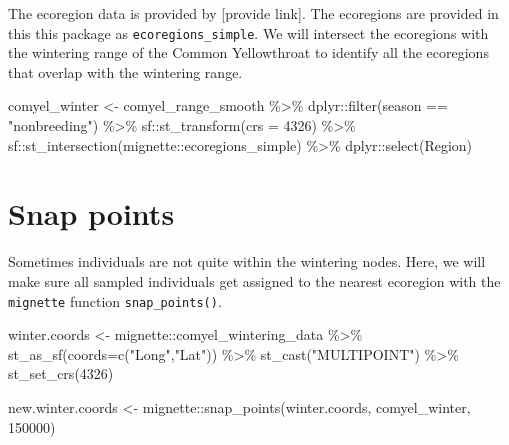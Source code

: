 \documentclass[
]{book}
\newenvironment{Shaded}{\begin{snugshade}}{\end{snugshade}}
\newcommand{\AttributeTok}[1]{\textcolor[rgb]{0.77,0.63,0.00}{#1}}
\newcommand{\DecValTok}[1]{\textcolor[rgb]{0.00,0.00,0.81}{#1}}
\newcommand{\FunctionTok}[1]{\textcolor[rgb]{0.00,0.00,0.00}{#1}}
\newcommand{\NormalTok}[1]{#1}
\newcommand{\OtherTok}[1]{\textcolor[rgb]{0.56,0.35,0.01}{#1}}
\newcommand{\SpecialCharTok}[1]{\textcolor[rgb]{0.00,0.00,0.00}{#1}}
\newcommand{\StringTok}[1]{\textcolor[rgb]{0.31,0.60,0.02}{#1}}
\begin{document}
The ecoregion data is provided by {[}provide link{]}. The ecoregions are provided in this this package as \texttt{ecoregions\_simple}. We will intersect the ecoregions with the wintering range of the Common Yellowthroat to identify all the ecoregions that overlap with the wintering range.

\begin{Shaded}
\begin{Highlighting}[]
\NormalTok{comyel\_winter }\OtherTok{\textless{}{-}}\NormalTok{ comyel\_range\_smooth }\SpecialCharTok{\%\textgreater{}\%}
\NormalTok{  dplyr}\SpecialCharTok{::}\FunctionTok{filter}\NormalTok{(season }\SpecialCharTok{==} \StringTok{"nonbreeding"}\NormalTok{) }\SpecialCharTok{\%\textgreater{}\%}
\NormalTok{  sf}\SpecialCharTok{::}\FunctionTok{st\_transform}\NormalTok{(}\AttributeTok{crs =} \DecValTok{4326}\NormalTok{) }\SpecialCharTok{\%\textgreater{}\%}
\NormalTok{  sf}\SpecialCharTok{::}\FunctionTok{st\_intersection}\NormalTok{(mignette}\SpecialCharTok{::}\NormalTok{ecoregions\_simple) }\SpecialCharTok{\%\textgreater{}\%}
\NormalTok{  dplyr}\SpecialCharTok{::}\FunctionTok{select}\NormalTok{(Region)}
\end{Highlighting}
\end{Shaded}

\hypertarget{snap-points}{%
\section{Snap points}\label{snap-points}}

Sometimes individuals are not quite within the wintering nodes. Here, we will make sure all sampled individuals get assigned to the nearest ecoregion with the \texttt{mignette} function \texttt{snap\_points()}.

\begin{Shaded}
\begin{Highlighting}[]
\NormalTok{winter.coords }\OtherTok{\textless{}{-}}\NormalTok{ mignette}\SpecialCharTok{::}\NormalTok{comyel\_wintering\_data }\SpecialCharTok{\%\textgreater{}\%}
  \FunctionTok{st\_as\_sf}\NormalTok{(}\AttributeTok{coords=}\FunctionTok{c}\NormalTok{(}\StringTok{"Long"}\NormalTok{,}\StringTok{"Lat"}\NormalTok{)) }\SpecialCharTok{\%\textgreater{}\%}
  \FunctionTok{st\_cast}\NormalTok{(}\StringTok{"MULTIPOINT"}\NormalTok{) }\SpecialCharTok{\%\textgreater{}\%}
  \FunctionTok{st\_set\_crs}\NormalTok{(}\DecValTok{4326}\NormalTok{)}
  
\NormalTok{new.winter.coords }\OtherTok{\textless{}{-}}\NormalTok{ mignette}\SpecialCharTok{::}\FunctionTok{snap\_points}\NormalTok{(winter.coords, comyel\_winter, }\DecValTok{150000}\NormalTok{)}
\end{Highlighting}
\end{Shaded}
\end{document}
